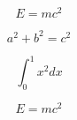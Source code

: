 
\begin{equation}
  E=mc^2
\end{equation}

\begin{equation}
  a^2+b^2=c^2
\end{equation}

\begin{equation}
  \int_0^1 x^2 dx
\end{equation}

\begin{equation}
  E=mc^2
\end{equation}
